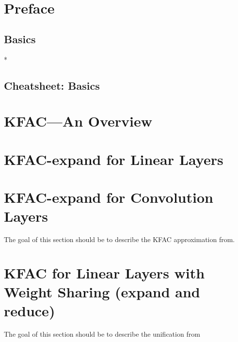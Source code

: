 \documentclass{article}
\begin{document}
\onecolumn


\clearpage


\clearpage

\tableofcontents
\clearpage

\section{Preface}

\clearpage

\begin{paracol}{2}
  \section{Basics}
  

  \switchcolumn[0]*
\end{paracol}

\clearpage
\begin{paracol}{1}
  \section{Cheatsheet: Basics}
  
\end{paracol}
\clearpage

\begin{paracol}{2}
  \section{KFAC---An Overview}
  

  \section{KFAC-expand for Linear Layers \cite{martens2015optimizing}}
  

  \section{KFAC-expand for Convolution Layers \cite{grosse2016kroneckerfactored}}
  The goal of this section should be to describe the KFAC approximation from.

  \section{KFAC for Linear Layers with Weight Sharing (expand and reduce)}
  The goal of this section should be to describe the unification from~\cite{eschenhagen2023kroneckerfactored}
\end{paracol}
\end{document}
